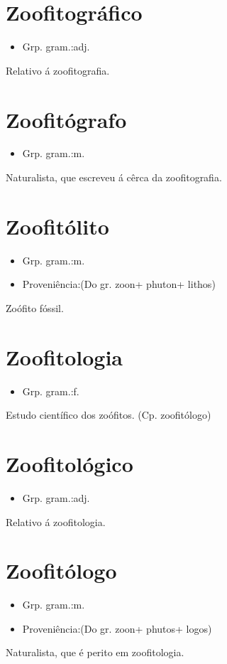 \section{Zoofitográfico}
\begin{itemize}
\item {Grp. gram.:adj.}
\end{itemize}
Relativo á zoofitografia.
\section{Zoofitógrafo}
\begin{itemize}
\item {Grp. gram.:m.}
\end{itemize}
Naturalista, que escreveu á cêrca da zoofitografia.
\section{Zoofitólito}
\begin{itemize}
\item {Grp. gram.:m.}
\end{itemize}
\begin{itemize}
\item {Proveniência:(Do gr. \textunderscore zoon\textunderscore  + \textunderscore phuton\textunderscore  + \textunderscore lithos\textunderscore )}
\end{itemize}
Zoófito fóssil.
\section{Zoofitologia}
\begin{itemize}
\item {Grp. gram.:f.}
\end{itemize}
Estudo científico dos zoófitos.
(Cp. \textunderscore zoofitólogo\textunderscore )
\section{Zoofitológico}
\begin{itemize}
\item {Grp. gram.:adj.}
\end{itemize}
Relativo á zoofitologia.
\section{Zoofitólogo}
\begin{itemize}
\item {Grp. gram.:m.}
\end{itemize}
\begin{itemize}
\item {Proveniência:(Do gr. \textunderscore zoon\textunderscore  + \textunderscore phutos\textunderscore  + \textunderscore logos\textunderscore )}
\end{itemize}
Naturalista, que é perito em zoofitologia.
